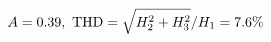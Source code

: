 \documentclass[preview]{standalone}
\begin{document}
\begin{align*}
\special{dvisvgm:raw <g id='unique000'>}A=0.39,\ \text{THD}=\sqrt{H_2^2+H_3^2}/H_1=7.6\%\special{dvisvgm:raw </g>}
\end{align*}
\end{document}
